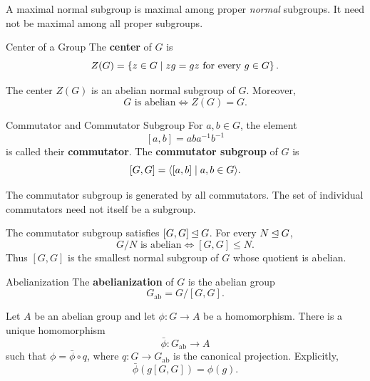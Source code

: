 \documentclass[12pt,a4paper]{article}
\begin{document}
    \begin{remark}
        A maximal normal subgroup is maximal among proper
        \emph{normal} subgroups. It need not be maximal among all
        proper subgroups.
    \end{remark}
    \bigskip
    
    \begin{defi}{Center of a Group}
        The \textbf{center} of $G$ is
        \[
            Z(G) = \left\{ z \in G \mid zg=gz
            \text{ for every } g \in G \right\}.
        \]
    \end{defi}
    \bigskip
    
    \begin{prop}
        The center $Z(G)$ is an abelian normal subgroup of $G$.
        Moreover,
        \[
            G \text{ is abelian} \iff Z(G)=G.
        \]
    \end{prop}
    \bigskip
    
    \begin{defi}{Commutator and Commutator Subgroup}
        For $a,b \in G$, the element
        \[
            [a,b] = aba^{-1}b^{-1}
        \]
        is called their \textbf{commutator}.
        The \textbf{commutator subgroup} of $G$ is
        \[
            [G,G] = \langle [a,b] \mid a,b \in G \rangle.
        \]
    \end{defi}
    \bigskip
    
    \begin{remark}
        The commutator subgroup is generated by all commutators.
        The set of individual commutators need not itself be a subgroup.
    \end{remark}
    \bigskip
    
    \begin{thm}
        The commutator subgroup satisfies $[G,G] \unlhd G$.
        For every $N \unlhd G$,
        \[
            \boxed{
                G/N \text{ is abelian} \iff [G,G] \le N.
            }
        \]
        Thus $[G,G]$ is the smallest normal subgroup of $G$
        whose quotient is abelian.
    \end{thm}
    \bigskip
    
    \begin{defi}{Abelianization}
        The \textbf{abelianization} of $G$ is the abelian group
        \[
            G_{\mathrm{ab}} = G/[G,G].
        \]
    \end{defi}
    \bigskip
    
    \begin{cor}
        Let $A$ be an abelian group and let $\phi \colon G \to A$
        be a homomorphism. There is a unique homomorphism
        \[
            \bar{\phi} \colon G_{\mathrm{ab}} \to A
        \]
        such that $\phi=\bar{\phi}\circ q$, where
        $q \colon G \to G_{\mathrm{ab}}$ is the canonical projection.
        Explicitly,
        \[
            \bar{\phi}(g[G,G])=\phi(g).
        \]
    \end{cor}
    \bigskip
\end{document}
